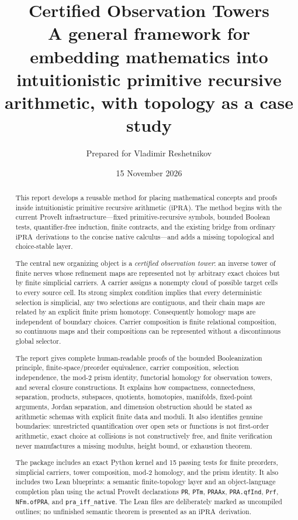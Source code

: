 \documentclass[11pt,oneside]{article}
\title{\textbf{Certified Observation Towers}\\
A general framework for embedding mathematics into intuitionistic primitive recursive arithmetic, with topology as a case study}
\author{Prepared for Vladimir Reshetnikov}
\date{15 November 2026}
\theoremstyle{definition}
\theoremstyle{remark}
\newcommand{\ipra}{\ensuremath{\mathrm{iPRA}}}
\newcommand{\code}[1]{\texttt{#1}}
\begin{document}
\maketitle

\begin{abstract}
This report develops a reusable method for placing mathematical concepts and proofs inside intuitionistic primitive recursive arithmetic (\ipra).  The method begins with the current ProveIt infrastructure---fixed primitive-recursive symbols, bounded Boolean tests, quantifier-free induction, finite contracts, and the existing bridge from ordinary \ipra\ derivations to the concise native calculus---and adds a missing topological and choice-stable layer.

The central new organizing object is a \emph{certified observation tower}: an inverse tower of finite nerves whose refinement maps are represented not by arbitrary exact choices but by finite simplicial carriers.  A carrier assigns a nonempty cloud of possible target cells to every source cell.  Its strong simplex condition implies that every deterministic selection is simplicial, any two selections are contiguous, and their chain maps are related by an explicit finite prism homotopy.  Consequently homology maps are independent of boundary choices.  Carrier composition is finite relational composition, so continuous maps and their compositions can be represented without a discontinuous global selector.

The report gives complete human-readable proofs of the bounded Booleanization principle, finite-space/preorder equivalence, carrier composition, selection independence, the mod-2 prism identity, functorial homology for observation towers, and several closure constructions.  It explains how compactness, connectedness, separation, products, subspaces, quotients, homotopies, manifolds, fixed-point arguments, Jordan separation, and dimension obstruction should be stated as arithmetic schemas with explicit finite data and moduli.  It also identifies genuine boundaries: unrestricted quantification over open sets or functions is not first-order arithmetic, exact choice at collisions is not constructively free, and finite verification never manufactures a missing modulus, height bound, or exhaustion theorem.

The package includes an exact Python kernel and 15 passing tests for finite preorders, simplicial carriers, tower composition, mod-2 homology, and the prism identity.  It also includes two Lean blueprints: a semantic finite-topology layer and an object-language completion plan using the actual ProveIt declarations \code{PR}, \code{PTm}, \code{PRAAx}, \code{PRA.qfInd}, \code{Prf}, \code{NFm.ofPRA}, and \code{pra\_iff\_native}.  The Lean files are deliberately marked as uncompiled outlines; no unfinished semantic theorem is presented as an \ipra\ derivation.
\end{abstract}
\end{document}
